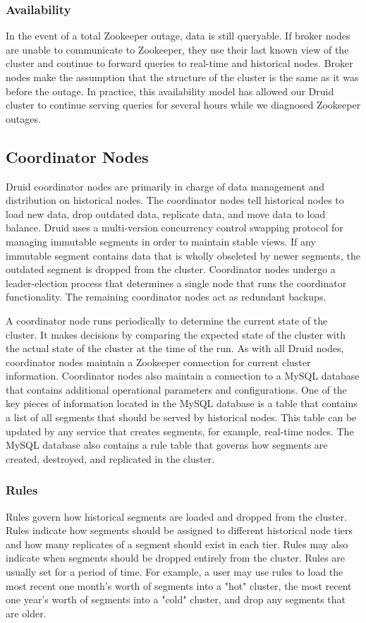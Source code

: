 \documentclass{acm_proc_article-sp}
\begin{document}
\subsubsection{Availability}
In the event of a total Zookeeper outage, data is still queryable.  If broker
nodes are unable to communicate to Zookeeper, they use their last known view of
the cluster and continue to forward queries to real-time and historical nodes.
Broker nodes make the assumption that the structure of the cluster is the same
as it was before the outage. In practice, this availability model has allowed
our Druid cluster to continue serving queries for several hours while we
diagnosed Zookeeper outages. 

\subsection{Coordinator Nodes}
Druid coordinator nodes are primarily in charge of data management and
distribution on historical nodes. The coordinator nodes tell historical nodes
to load new data, drop outdated data, replicate data, and move data to load
balance. Druid uses a multi-version concurrency control swapping protocol for
managing immutable segments in order to maintain stable views.  If any
immutable segment contains data that is wholly obseleted by newer segments, the
outdated segment is dropped from the cluster. Coordinator nodes undergo a
leader-election process that determines a single node that runs the coordinator
functionality. The remaining coordinator nodes act as redundant backups.

A coordinator node runs periodically to determine the current state of the
cluster. It makes decisions by comparing the expected state of the cluster with
the actual state of the cluster at the time of the run. As with all Druid
nodes, coordinator nodes maintain a Zookeeper connection for current cluster
information. Coordinator nodes also maintain a connection to a MySQL
database that contains additional operational parameters and configurations.
One of the key pieces of information located in the MySQL database is a table
that contains a list of all segments that should be served by historical nodes.
This table can be updated by any service that creates segments, for example,
real-time nodes. The MySQL database also contains a rule table that governs how
segments are created, destroyed, and replicated in the cluster.

\subsubsection{Rules}
Rules govern how historical segments are loaded and dropped from the cluster.
Rules indicate how segments should be assigned to different historical node
tiers and how many replicates of a segment should exist in each tier. Rules may
also indicate when segments should be dropped entirely from the cluster. Rules
are usually set for a period of time.  For example, a user may use rules to
load the most recent one month's worth of segments into a "hot" cluster, the
most recent one year's worth of segments into a "cold" cluster, and drop any
segments that are older.
\end{document}

